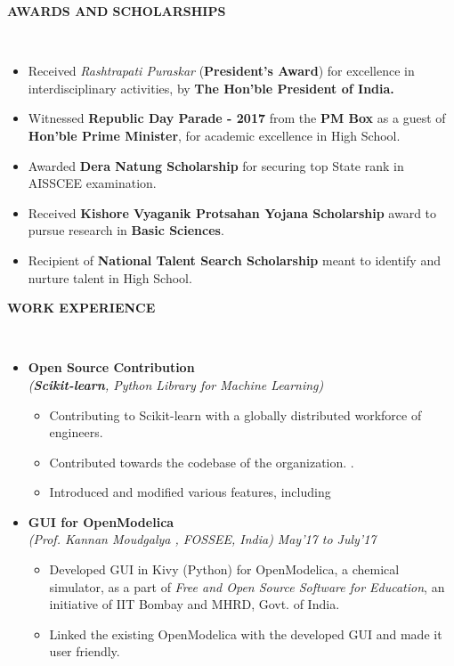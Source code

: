 \documentclass[a4paper,10pt]{article}
\newcommand{\isep}{-2 pt}
\newcommand{\lsep}{-0.5cm}
\newcommand{\blank}[1]{\hspace*{#1}}
\newcommand{\resheading}[1]{{\small \colorbox{mygrey}{\begin{minipage}{0.975\textwidth}{\textbf{#1 \vphantom{p\^{E}}}}\end{minipage}}}}
\begin{document}
\resheading{\textbf{AWARDS AND SCHOLARSHIPS} }\\[\lsep]
\begin{itemize}
\setlength\itemsep{0.05em}
\item \noindent Received \emph{Rashtrapati Puraskar} (\textbf{President's Award}) for excellence in interdisciplinary activities, by \textbf{The Hon'ble President of India.}
\item \noindent Witnessed \textbf{Republic Day Parade - 2017} from the \textbf{PM Box} as a guest of \textbf{Hon'ble Prime Minister}, for academic excellence in High School.
\item \noindent Awarded \textbf{Dera Natung Scholarship} for securing top State rank in AISSCEE examination.
\item \noindent Received \textbf{Kishore Vyaganik Protsahan Yojana Scholarship} award to pursue research in \textbf{Basic Sciences}.
\item \noindent Recipient of \textbf{National Talent Search Scholarship} meant to identify and nurture talent in High School.
\end{itemize}

\resheading{\textbf{WORK EXPERIENCE} }\\[\lsep]
\begin{itemize}
\item \textbf{Open Source Contribution
}  \\
 \emph{(\textbf{Scikit-learn}, Python Library for Machine Learning)} \\[-0.6cm]
	\begin{itemize}\itemsep \isep
	\item Contributing to Scikit-learn with a globally distributed workforce of engineers.
	
	\item Contributed towards the codebase of the organization.
.
	\item Introduced and modified various features, including 

	\end{itemize}

\item \textbf{GUI for OpenModelica} \\
 \emph{(Prof. Kannan Moudgalya 
, FOSSEE, India)} \blank{7.5cm} \emph{May'17 to July'17} \\[-0.6cm]
	\begin{itemize}\itemsep \isep
	\item Developed GUI in Kivy (Python) for OpenModelica, a chemical simulator, as a part of \emph{Free and Open Source Software for Education}, an initiative of IIT Bombay and MHRD, Govt. of India.
	\item Linked the existing OpenModelica with the developed GUI and made it user friendly.
	\end{itemize}
\end{itemize}
\end{document}
